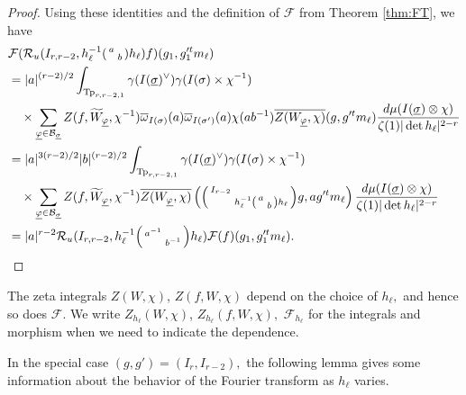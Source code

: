 \documentclass[12pt]{amsart}
\theoremstyle{remark}
\numberwithin{equation}{section}
\theoremstyle{definition}
\newenvironment{psmatrix}
  {\left(\begin{smallmatrix}}
  {\end{smallmatrix}\right)}
\numberwithin{equation}{subsection}
\begin{document}
\begin{proof}
Using these identities and the definition of $\mathcal{F}$ from Theorem \ref{thm:FT}, we have 
\begin{align*} 
&\mathcal{F}(\mathcal{R}_u(I_{r,r-2},h_\ell^{-1}\begin{psmatrix} a & \\ & b \end{psmatrix} h_\ell)f)(g_1,g'^t_1m_{\ell})\\
    &=|a|^{(r-2)/2}\int_{\mathrm{Tp}_{r,r-2,1}}\gamma(I(\underline{\sigma})^\vee)\gamma(
  I(\sigma)\times\chi^{-1})\\& \quad\times 
    \sum_{\underline{\varphi} \in \mathcal{B}_{\underline{\sigma}}}
    Z(f,\widetilde{W}_{\underline{\varphi}},\chi^{-1})\overline{\omega}_{I(\sigma)}(a)\overline{\omega}_{I(\sigma')}(a)\chi(ab^{-1})\overline{Z(W_{\underline{\varphi}},\chi)}(g,g'^tm_{\ell})\frac{d\mu(I(\underline{\sigma}) \otimes \chi)}{\zeta(1)|\det h_\ell|^{2-r}}\\
    &=|a|^{3(r-2)/2}|b|^{(r-2)/2}\int_{\mathrm{Tp}_{r,r-2,1}}\gamma(I(\underline{\sigma})^\vee)\gamma(
  I(\sigma)\times\chi^{-1})\\& \quad\times 
    \sum_{\underline{\varphi} \in \mathcal{B}_{\underline{\sigma}}}
    Z(f,\widetilde{W}_{\underline{\varphi}},\chi^{-1})\overline{Z(W_{\underline{\varphi}},\chi)}\left(\begin{psmatrix}
        I_{r-2} & \\
        & h_\ell^{-1}\begin{psmatrix} a & \\ & b \end{psmatrix} h_\ell
    \end{psmatrix}g,ag'^tm_{\ell}\right)\frac{d\mu(I(\underline{\sigma}) \otimes \chi)}{\zeta(1)|\det h_\ell|^{2-r}}\\
    &=|a|^{r-2}\mathcal{R}_u(I_{r,r-2},h_{\ell}^{-1}\begin{psmatrix} a^{-1} & \\ & b^{-1} \end{psmatrix}h_\ell)\mathcal{F}(f)(g_1,g_1'^tm_{\ell}).
\end{align*}
\end{proof}


The zeta integrals $Z(W,\chi)$, $Z(f,W,\chi)$ depend on the choice of $h_\ell,$ and hence so does $\mathcal{F}.$  We write $Z_{h_{\ell}}(W,\chi)$, $Z_{h_{\ell}}(f,W,\chi),$ $\mathcal{F}_{h_\ell}$ for the integrals and morphism when we need to indicate the dependence. 

In the special case $(g,g')=(I_r,I_{r-2}),$ the following lemma gives some information about the behavior of the Fourier transform as $h_\ell$ varies.
\end{document}
